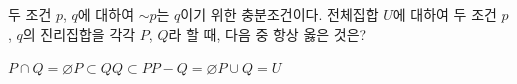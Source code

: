 두 조건 $p$, $q$에 대하여 $\sim p$는 $q$이기 위한 충분조건이다. 전체집합 $U$에 대하여 두 조건 $p$, $q$의 진리집합을 각각 $P$, $Q$라 할 때, 다음 중 항상 옳은 것은?
\begin{choices32}{$P\cap Q=\varnothing$}{$P\subset Q$}{$Q\subset P$}{$P-Q=\varnothing$}{$P\cup Q=U$}\end{choices32}
